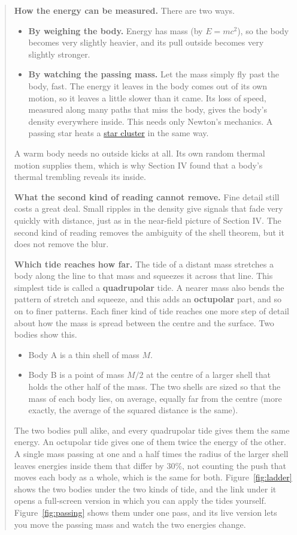 \begin{quote}
\textbf{How the energy can be measured.} There are two ways.
\begin{itemize}
\item \textbf{By weighing the body.} Energy has mass (by $E = mc^2$), so the body
becomes very slightly heavier, and its pull outside becomes very slightly
stronger.
\item \textbf{By watching the passing mass.} Let the mass simply fly past the
body, fast. The energy it leaves in the body comes out of its own motion, so it
leaves a little slower than it came. Its loss of speed, measured along many
paths that miss the body, gives the body's density everywhere inside. This
needs only Newton's mechanics. A passing star heats a
\href{https://en.wikipedia.org/wiki/Star_cluster}{star cluster} in the same way.
\end{itemize}
A warm body needs no outside kicks at all. Its own random thermal motion
supplies them, which is why Section IV found that a body's thermal trembling
reveals its inside.

\textbf{What the second kind of reading cannot remove.} Fine detail still costs
a great deal. Small ripples in the density give signals that fade very quickly
with distance, just as in the near-field picture of Section IV. The second kind
of reading removes the ambiguity of the shell theorem, but it does not remove
the blur.

\textbf{Which tide reaches how far.} The tide of a distant mass stretches a body
along the line to that mass and squeezes it across that line. This simplest
tide is called a \textbf{quadrupolar} tide. A nearer mass also bends the
pattern of stretch and squeeze, and this adds an \textbf{octupolar} part, and so
on to finer patterns. Each finer kind of tide reaches one more step of detail
about how the mass is spread between the centre and the surface. Two bodies
show this.
\begin{itemize}
\item Body A is a thin shell of mass $M$.
\item Body B is a point of mass $M/2$ at the centre of a larger shell that holds
the other half of the mass. The two shells are sized so that the mass of each
body lies, on average, equally far from the centre (more exactly, the average
of the squared distance is the same).
\end{itemize}
The two bodies pull alike, and every quadrupolar tide gives them the same
energy. An octupolar tide gives one of them twice the energy of the other. A
single mass passing at one and a half times the radius of the larger shell
leaves energies inside them that differ by $30\%$, not counting the push that
moves each body as a whole, which is the same for both. Figure~\ref{fig:ladder} shows the two bodies under the two kinds of tide, and the link under it opens a full-screen version in which you can apply the tides yourself. Figure~\ref{fig:passing} shows them under one pass, and its live version lets you move the passing mass and watch the two energies change.


\end{quote}
